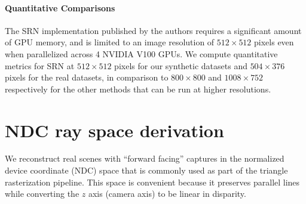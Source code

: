 \documentclass[runningheads]{llncs}
\begin{document}
\paragraph{\textbf{Quantitative Comparisons}} The SRN implementation published by the authors requires a significant amount of GPU memory, and is limited to an image resolution of $512 \times 512$ pixels even when parallelized across 4 NVIDIA V100 GPUs. We compute quantitative metrics for SRN at $512 \times 512$ pixels for our synthetic datasets and $504 \times 376$ pixels for the real datasets, in comparison to $800\times 800$ and $1008 \times 752$ respectively for the other methods that can be run at higher resolutions.


\section{NDC ray space derivation}

We reconstruct real scenes with ``forward facing'' captures in the normalized device coordinate (NDC) space that is commonly used as part of the triangle rasterization pipeline. This space is convenient because it preserves parallel lines while converting the $z$ axis (camera axis) to be linear in disparity.
\end{document}
